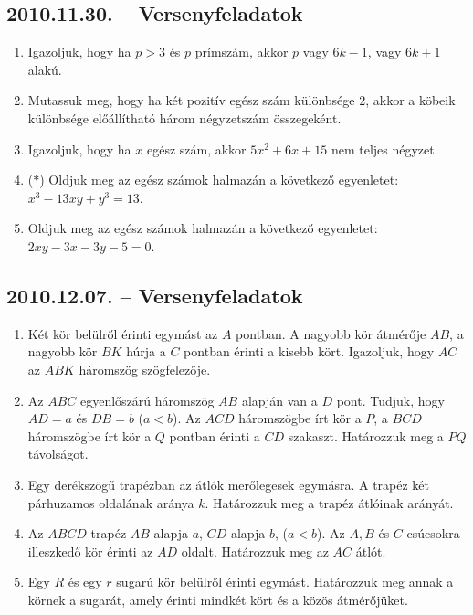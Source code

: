 \subsection*{2010.11.30. -- Versenyfeladatok}
\begin{enumerate}
\item Igazoljuk, hogy ha $p>3$ és $p$ prímszám, akkor $p$ vagy $6k-1$, vagy $6k+1$
alakú.
\item Mutassuk meg, hogy ha két pozitív egész szám különbsége 2, akkor a köbeik különbsége előállítható három négyzetszám összegeként.
\item Igazoljuk, hogy ha $x$ egész szám, akkor $5x^2+6x+15$ nem teljes négyzet.
\item ($*$) Oldjuk meg az egész számok halmazán a következő egyenletet: $x^3-13xy+y^3=13$.
\item Oldjuk meg az egész számok halmazán a következő egyenletet: $2xy-3x-3y-5=0$.
\end{enumerate}

\subsection*{2010.12.07. -- Versenyfeladatok}
\begin{enumerate}
\item Két kör belülről érinti egymást az $A$ pontban. A nagyobb kör átmérője $AB$,
a nagyobb kör $BK$ húrja a $C$ pontban érinti a kisebb kört. Igazoljuk, hogy $AC$ az $ABK$ háromszög szögfelezője.
\item Az $ABC$ egyenlőszárú háromszög $AB$ alapján van a $D$ pont. Tudjuk, hogy
$AD=a$ és $DB=b$ ($a<b$). Az $ACD$ háromszögbe írt kör a $P$, a $BCD$ háromszögbe írt kör a $Q$ pontban érinti a $CD$ szakaszt. Határozzuk meg a $PQ$ távolságot.
\item Egy derékszögű trapézban az átlók merőlegesek egymásra. A trapéz két párhuzamos oldalának aránya $k$. Határozzuk meg a trapéz átlóinak arányát.
\item Az $ABCD$ trapéz $AB$ alapja $a$, $CD$ alapja $b$, ($a<b$). Az $A,B$ és $C$ csúcsokra illeszkedő kör érinti az $AD$ oldalt. Határozzuk meg az $AC$ átlót.
\item Egy $R$ és egy $r$ sugarú kör belülről érinti egymást. Határozzuk meg annak a körnek a sugarát, amely érinti mindkét kört és a közös átmérőjüket.
\end{enumerate}

